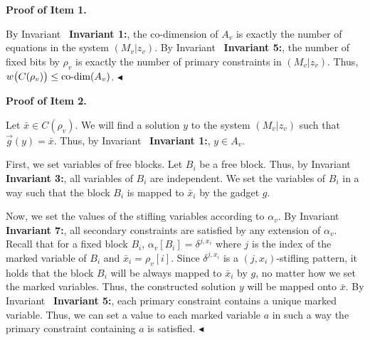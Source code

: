 


\par\medskip\noindent\textbf{Proof of Item 1.}\par




By Invariant \textbf{ Invariant 1:}, the co-dimension of $A_{v}$ is exactly the number of equations in the system $(M_{v}|z_{v})$.
By Invariant \textbf{ Invariant 5:}, the number of fixed bits by $\rho_{v}$ is exactly the number of primary constraints in $(M_{v}|z_{v})$.
Thus, $w\bigl{(}C(\rho_{v})\bigr{)}\leq\text{co-dim}(A_{v})$.
$\blacktriangleleft$\par





\par\medskip\noindent\textbf{Proof of Item 2.}\par




Let $\bar{x}\in C(\rho_{v})$.
We will find a solution $y$ to the system $(M_{v}|z_{v})$ such that $\overrightarrow{g}(y)=\bar{x}$.
Thus, by Invariant \textbf{ Invariant 1:}, $y\in A_{v}$.\par




First, we set variables of free blocks.
Let $B_{i}$ be a free block.
Thus, by Invariant \textbf{ Invariant 3:}, all variables of $B_{i}$ are independent.
We set the variables of $B_{i}$ in a way such that the block $B_{i}$ is mapped to $\bar{x}_{i}$ by the gadget $g$.\par




Now, we set the values of the stifling variables according to $\alpha_{v}$.
By Invariant \textbf{ Invariant 7:}, all secondary constraints are satisfied by any extension of $\alpha_{v}$.
Recall that for a fixed block $B_{i}$, $\alpha_{v}[B_{i}]=\delta^{j,x_{i}}$ where $j$ is the index of the marked variable of $B_{i}$ and $\bar{x}_{i}=\rho_{v}[i]$.
Since $\delta^{j,x_{i}}$ is a $(j,x_{i})$-stifling pattern, it holds that the block $B_{i}$ will be always mapped to $\bar{x}_{i}$ by $g$, no matter how we set the marked variables.
Thus, the constructed solution $y$ will be mapped onto $\bar{x}$.
By Invariant \textbf{ Invariant 5:}, each primary constraint contains a unique marked variable.
Thus, we can set a value to each marked variable $a$ in such a way the primary constraint containing $a$ is satisfied.
$\blacktriangleleft$\par





